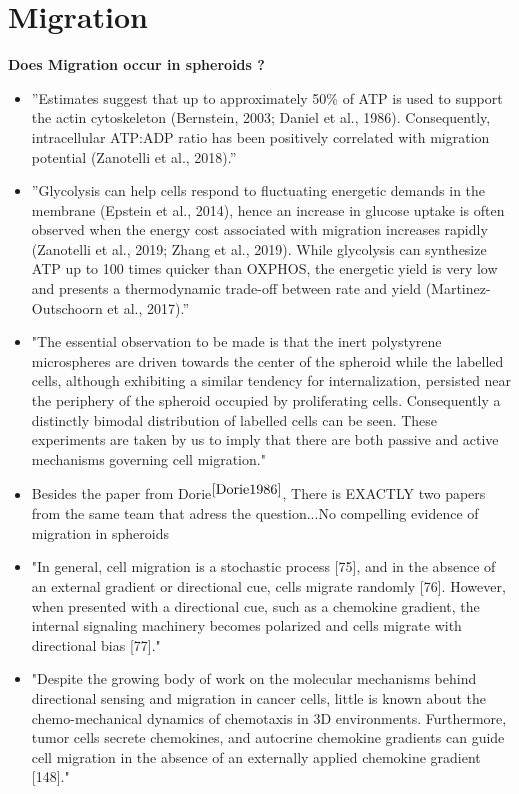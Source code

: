 \documentclass[11pt,a4paper]{article}
\begin{document}
\section{Migration}
\textbf{Does Migration occur in spheroids ?}
\begin{itemize}
\item ”Estimates suggest that up to approximately 50\% of ATP is used to support the actin cytoskeleton (Bernstein, 2003; Daniel et al., 1986). Consequently, intracellular ATP:ADP ratio has been positively correlated with migration potential (Zanotelli et al., 2018).”\cite{Zanotelli2021}
\item ”Glycolysis can help cells respond to fluctuating energetic demands in the membrane (Epstein et al., 2014), hence an increase in glucose uptake is often observed when the
energy cost associated with migration increases rapidly (Zanotelli et al., 2019; Zhang et al., 2019). While glycolysis can synthesize ATP up to 100 times quicker than OXPHOS,
the energetic yield is very low and presents a thermodynamic trade-off between rate and yield (Martinez-Outschoorn et al., 2017).”
\item "The essential observation to be
made is that the inert polystyrene microspheres are driven towards the center of the spheroid while the labelled cells, although exhibiting a similar tendency for internalization, persisted near the periphery of the spheroid occupied by proliferating cells. Consequently a distinctly bimodal distribution of labelled cells can be seen. These experiments are taken by us to imply that there are both passive and active mechanisms governing cell migration."
\item Besides the paper from Dorie$^{\cite{Dorie1986}}$, There is EXACTLY two papers from the same team that adress the question...No compelling evidence of migration in spheroids
\item "In general, cell migration is a stochastic process [75], and in the absence of an external gradient or directional cue, cells migrate randomly [76]. However, when presented with a directional cue, such as a chemokine gradient, the internal signaling machinery becomes polarized and cells migrate with directional bias [77]."\cite{Polacheck2012}
\item "Despite the growing body of work on the molecular mechanisms behind directional sensing and migration in cancer cells, little is known about the chemo-mechanical dynamics of chemotaxis in 3D environments. Furthermore, tumor cells secrete chemokines, and autocrine chemokine gradients can guide cell migration in the absence of an externally applied chemokine gradient [148]." \cite{Polacheck2012}

\end{itemize}
\end{document}
